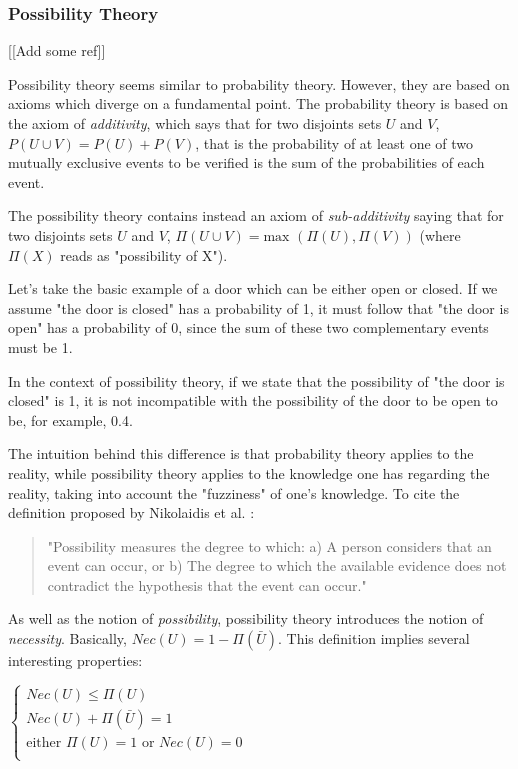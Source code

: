 \subsubsection{Possibility Theory}

[[Add some ref]]

Possibility theory seems similar to probability theory. However, they are based on axioms which diverge on a fundamental point.
The probability theory is based on the axiom of \emph{additivity}, which says that for two disjoints sets $U$ and $V$, $P(U \cup V) = P(U)+ P(V)$, that is the probability of at least one of two mutually exclusive events to be verified is the sum of the probabilities of each event.

The possibility theory contains instead an axiom of \emph{sub-additivity} saying that for two disjoints sets $U$ and $V$, $\Pi(U \cup V) = \text{max }(\Pi(U), \Pi(V))$ (where $\Pi(X)$ reads as "possibility of X").

Let's take the basic example of a door which can be either open or closed. If we assume "the door is closed" has a probability of 1, it must follow that "the door is open" has a probability of 0, since the sum of these two complementary events must be 1.

In the context of possibility theory, if we state that the possibility of "the door is closed" is 1, it is not incompatible with the possibility of the door to be open to be, for example, 0.4.

The intuition behind this difference is that probability theory applies to the reality, while possibility theory applies to the knowledge one has regarding the reality, taking into account the "fuzziness" of one's knowledge. To cite the definition proposed by Nikolaidis et al. \cite{nikolaidis:386}:
\begin{quote}
"Possibility measures the degree to which: a) A person considers that an event can
occur, or b) The degree to which the available evidence does not contradict the
hypothesis that the event can occur."
\end{quote}

As well as the notion of \emph{possibility}, possibility theory introduces the notion of \emph{necessity}. Basically, $Nec(U) = 1 - \Pi(\bar{U})$.
This definition implies several interesting properties:

$\left\{
\begin{array}{l}
Nec(U) \leq \Pi(U)\\
Nec(U) + \Pi(\bar{U}) = 1\\
\text{either } \Pi(U) = 1 \text{ or } Nec(U) = 0\\
\end{array}
\right.$

